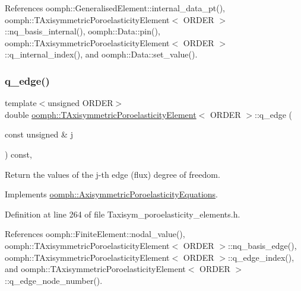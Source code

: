 References oomph\+::\+Generalised\+Element\+::internal\+\_\+data\+\_\+pt(), oomph\+::\+T\+Axisymmetric\+Poroelasticity\+Element$<$ O\+R\+D\+E\+R $>$\+::nq\+\_\+basis\+\_\+internal(), oomph\+::\+Data\+::pin(), oomph\+::\+T\+Axisymmetric\+Poroelasticity\+Element$<$ O\+R\+D\+E\+R $>$\+::q\+\_\+internal\+\_\+index(), and oomph\+::\+Data\+::set\+\_\+value().

\mbox{\label{classoomph_1_1TAxisymmetricPoroelasticityElement_a155b8606a7c2602cc88ec15ae0a19a8f}} 
\subsubsection{\texorpdfstring{q\+\_\+edge()}{q\_edge()}\hspace{0.1cm}{\footnotesize\ttfamily [1/2]}}
{\footnotesize\ttfamily template$<$unsigned O\+R\+D\+ER$>$ \\
double \hyperlink{classoomph_1_1TAxisymmetricPoroelasticityElement}{oomph\+::\+T\+Axisymmetric\+Poroelasticity\+Element}$<$ O\+R\+D\+ER $>$\+::q\+\_\+edge (\begin{DoxyParamCaption}\item[{const unsigned \&}]{j }\end{DoxyParamCaption}) const\hspace{0.3cm}{\ttfamily [inline]}, {\ttfamily [virtual]}}



Return the values of the j-\/th edge (flux) degree of freedom. 



Implements \hyperlink{classoomph_1_1AxisymmetricPoroelasticityEquations_adf0d3ac9623d62b353e44e82984cf01f}{oomph\+::\+Axisymmetric\+Poroelasticity\+Equations}.



Definition at line 264 of file Taxisym\+\_\+poroelasticity\+\_\+elements.\+h.



References oomph\+::\+Finite\+Element\+::nodal\+\_\+value(), oomph\+::\+T\+Axisymmetric\+Poroelasticity\+Element$<$ O\+R\+D\+E\+R $>$\+::nq\+\_\+basis\+\_\+edge(), oomph\+::\+T\+Axisymmetric\+Poroelasticity\+Element$<$ O\+R\+D\+E\+R $>$\+::q\+\_\+edge\+\_\+index(), and oomph\+::\+T\+Axisymmetric\+Poroelasticity\+Element$<$ O\+R\+D\+E\+R $>$\+::q\+\_\+edge\+\_\+node\+\_\+number().

